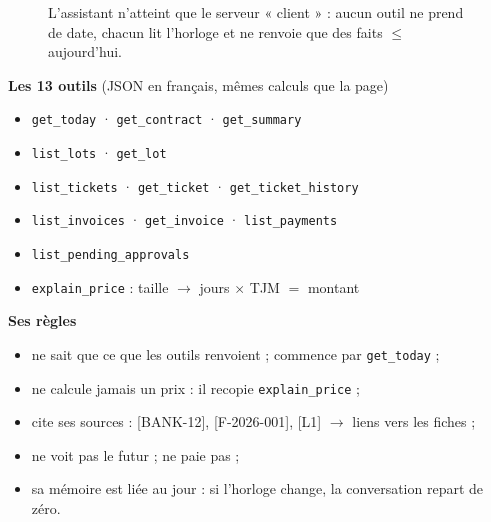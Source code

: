 \documentclass[11pt,a4paper]{article}
\newcommand{\key}[1]{\texttt{#1}}
\begin{document}
\begin{figure}[H]\centering
{}
\caption{L'assistant n'atteint que le serveur « client » : aucun outil ne prend de date, chacun lit l'horloge et ne renvoie que des faits $\le$ aujourd'hui.}
\end{figure}

\noindent\begin{minipage}[t]{0.5\linewidth}
\textbf{Les 13 outils} (JSON en français, mêmes calculs que la page)
\begin{itemize}\footnotesize
  \item \key{get\_today} · \key{get\_contract} · \key{get\_summary}
  \item \key{list\_lots} · \key{get\_lot}
  \item \key{list\_tickets} · \key{get\_ticket} · \key{get\_ticket\_history}
  \item \key{list\_invoices} · \key{get\_invoice} · \key{list\_payments}
  \item \key{list\_pending\_approvals}
  \item \key{explain\_price} : taille $\to$ jours $\times$ TJM $=$ montant
\end{itemize}
\end{minipage}\hfill
\begin{minipage}[t]{0.47\linewidth}
\textbf{Ses règles}
\begin{itemize}\footnotesize
  \item ne sait que ce que les outils renvoient ; commence par \key{get\_today} ;
  \item ne calcule jamais un prix : il recopie \key{explain\_price} ;
  \item cite ses sources : [BANK-12], [F-2026-001], [L1] $\to$ liens vers les fiches ;
  \item ne voit pas le futur ; ne paie pas ;
  \item sa mémoire est liée au jour : si l'horloge change, la conversation repart de zéro.
\end{itemize}
\end{minipage}
\end{document}

